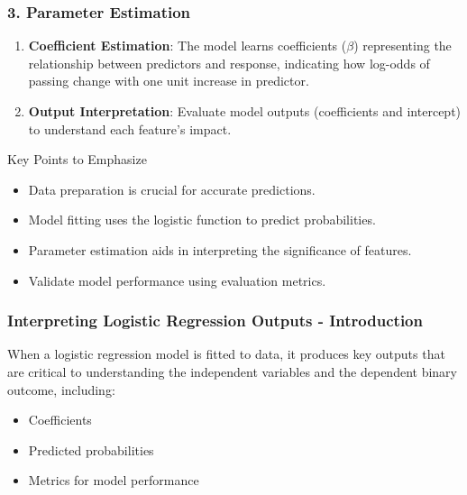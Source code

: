 \documentclass[aspectratio=169]{beamer}
\begin{document}
\begin{frame}
    \frametitle{3. Parameter Estimation}

    \begin{enumerate}
        \item \textbf{Coefficient Estimation}: The model learns coefficients ($\beta$) representing the relationship between predictors and response, indicating how log-odds of passing change with one unit increase in predictor.
        
        \item \textbf{Output Interpretation}: Evaluate model outputs (coefficients and intercept) to understand each feature's impact.
    \end{enumerate}
    
    \begin{block}{Key Points to Emphasize}
        \begin{itemize}
            \item Data preparation is crucial for accurate predictions.
            \item Model fitting uses the logistic function to predict probabilities.
            \item Parameter estimation aids in interpreting the significance of features.
            \item Validate model performance using evaluation metrics.
        \end{itemize}
    \end{block}
\end{frame}

\begin{frame}[fragile]
    \frametitle{Interpreting Logistic Regression Outputs - Introduction}
    When a logistic regression model is fitted to data, it produces key outputs that are critical to understanding the independent variables and the dependent binary outcome, including:
    \begin{itemize}
        \item Coefficients
        \item Predicted probabilities
        \item Metrics for model performance
    \end{itemize}
\end{frame}
\end{document}
